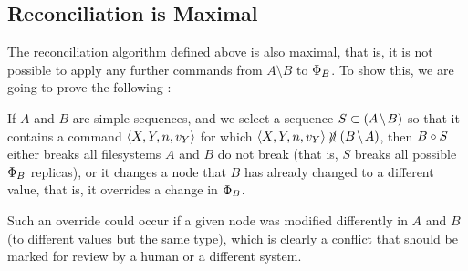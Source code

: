 
\subsection{Reconciliation is Maximal}


The reconciliation algorithm defined above is also maximal, that is,
it is not possible to apply any further commands from $A\setminus B$ to $\Phi_B$.
To show this, we are going to prove the following :

\begin{myth}\label{rec_is_complete}
If $A$ and $B$ are simple sequences,
and we select a sequence $S\subset \amb$ so that
it contains a command $\langle{X,Y,n,v_Y}\rangle$ for which $\cxynv\nindep\bma$,
then $B\circ S$ either breaks all filesystems $A$ and $B$ do not break
(that is, $S$ breaks all possible $\Phi_B$ replicas),
or it changes a node that $B$ has already changed to a different value,
that is, it overrides a change in $\Phi_B$.
\end{myth}
Such an override could occur if a given node was modified differently in
$A$ and $B$ (to different values but the same type), which is clearly
a conflict that should be marked for review
by a human or a different system.
